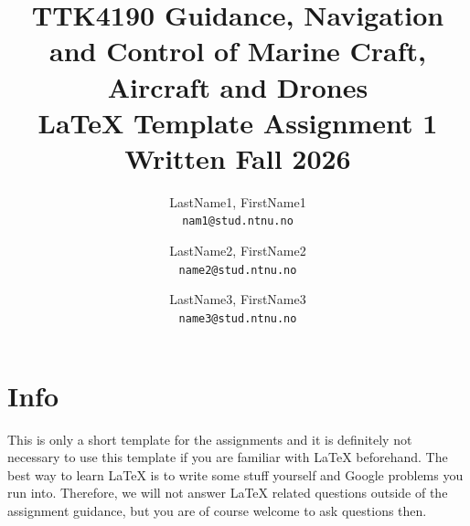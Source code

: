 \documentclass[a4paper]{article}
\title{\Large TTK4190 Guidance, Navigation and Control of Marine Craft, Aircraft and Drones \\
\vspace{10pt}
\Large \LaTeX{} Template Assignment 1 \\
\vspace{10pt}
\large Written Fall 2026}
\author{
  LastName1, FirstName1\\
  \texttt{nam1@stud.ntnu.no}
  \and
  LastName2, FirstName2\\
  \texttt{name2@stud.ntnu.no}
  \and
  LastName3, FirstName3\\
  \texttt{name3@stud.ntnu.no}
}
\begin{document}
\maketitle

\section*{Info}
This is only a short template for the assignments and it is definitely not necessary to use this template if you are familiar with \LaTeX{} beforehand. The best way to learn \LaTeX{} is to write some stuff yourself and Google problems you run into. Therefore, we will not answer \LaTeX{} related questions outside of the assignment guidance, but you are of course welcome to ask questions then.


 


\end{document}

